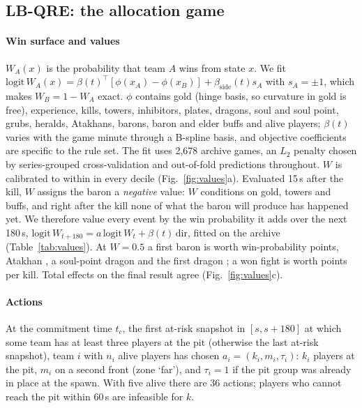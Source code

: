 \subsection{LB-QRE: the allocation game}

\paragraph*{Win surface and values}
$W_A(x)$ is the probability that team $A$ wins from state $x$. We fit $\mathrm{logit}\,W_A(x)=\beta(t)^\top[\phi(x_A)-\phi(x_B)]+\beta_{\mathrm{side}}(t)s_A$ with $s_A=\pm1$, which makes $W_B=1-W_A$ exact. $\phi$ contains gold (hinge basis, so curvature in gold is free), experience, kills, towers, inhibitors, plates, dragons, soul and soul point, grubs, heralds, Atakhans, barons, baron and elder buffs and alive players; $\beta(t)$ varies with the game minute through a B-spline basis, and objective coefficients are specific to the rule set. The fit uses 2,678 archive games, an $L_2$ penalty chosen by series-grouped cross-validation and out-of-fold predictions throughout.
$W$ is calibrated to within \pp{} in every decile (Fig.~\ref{fig:values}a).
Evaluated 15\,s after the kill, $W$ assigns the baron a \emph{negative} value: $W$ conditions on gold, towers and buffs, and right after the kill none of what the baron will produce has happened yet.
We therefore value every event by the win probability it adds over the next 180\,s, $\mathrm{logit}\,W_{t+180}=a\,\mathrm{logit}\,W_t+\beta(t)\,\mathrm{dir}$, fitted on the archive (Table~\ref{tab:values}).
At $W=0.5$ a first baron is worth  win-probability points, Atakhan , a soul-point dragon  and the first dragon ; a won fight is worth  points per kill.
Total effects on the final result agree (Fig.~\ref{fig:values}c).



\paragraph*{Actions}
At the commitment time $t_c$, the first at-risk snapshot in $[s,s{+}180]$ at which some team has at least three players at the pit (otherwise the last at-risk snapshot), team $i$ with $n_i$ alive players has chosen $a_i=(k_i,m_i,\tau_i)$: $k_i$ players at the pit, $m_i$ on a second front (zone `far'), and $\tau_i=1$ if the pit group was already in place at the spawn.
With five alive there are 36 actions; players who cannot reach the pit within 60\,s are infeasible for $k$.

